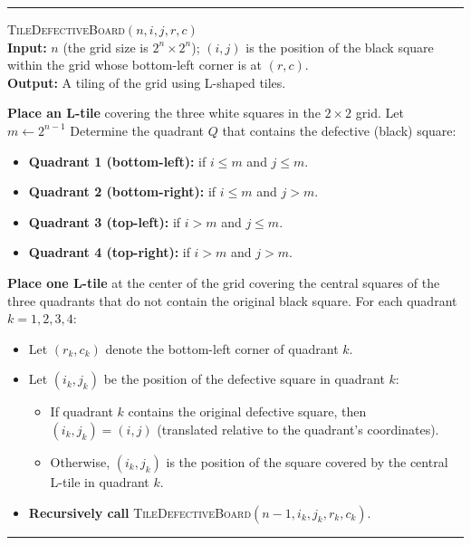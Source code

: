 \documentclass[11pt]{article}
\begin{document}
    \par\noindent\rule{\textwidth}{0.4pt}
    \smallskip        
    \textsc{TileDefectiveBoard}$(n, i, j, r, c)$ \\
    \textbf{Input:} \( n \) (the grid size is \( 2^n \times 2^n \)); \((i,j)\) is the position of the black square within the grid whose bottom-left corner is at \((r,c)\). \\
    \textbf{Output:} A tiling of the grid using L-shaped tiles.
    \begin{algorithmic}[1]
            \STATE \textbf{Place an L-tile} covering the three white squares in the \(2\times2\) grid.
            \RETURN
        \ENDIF
        \STATE Let \( m \gets 2^{n-1} \)  
        \STATE Determine the quadrant \( Q \) that contains the defective (black) square:
        \begin{itemize}
            \item \textbf{Quadrant 1 (bottom-left):} if \( i \le m \) and \( j \le m \).
            \item \textbf{Quadrant 2 (bottom-right):} if \( i \le m \) and \( j > m \).
            \item \textbf{Quadrant 3 (top-left):} if \( i > m \) and \( j \le m \).
            \item \textbf{Quadrant 4 (top-right):} if \( i > m \) and \( j > m \).
        \end{itemize}
        \STATE \textbf{Place one L-tile} at the center of the grid covering the central squares of the three quadrants that do not contain the original black square.
        \STATE For each quadrant \( k = 1,2,3,4 \):
        \begin{itemize}
            \item Let \((r_k, c_k)\) denote the bottom-left corner of quadrant \( k \).
            \item Let \((i_k, j_k)\) be the position of the defective square in quadrant \( k \):
            \begin{itemize}
                \item If quadrant \( k \) contains the original defective square, then \((i_k, j_k) = (i, j)\) (translated relative to the quadrant’s coordinates).
                \item Otherwise, \((i_k, j_k)\) is the position of the square covered by the central L-tile in quadrant \( k \).
            \end{itemize}
            \item \textbf{Recursively call} \textsc{TileDefectiveBoard}\((n-1, i_k, j_k, r_k, c_k)\).
        \end{itemize}
        \RETURN
    \end{algorithmic}
    \vspace{-2mm}
    \par\noindent\rule{\textwidth}{0.4pt}
    
\end{document}
